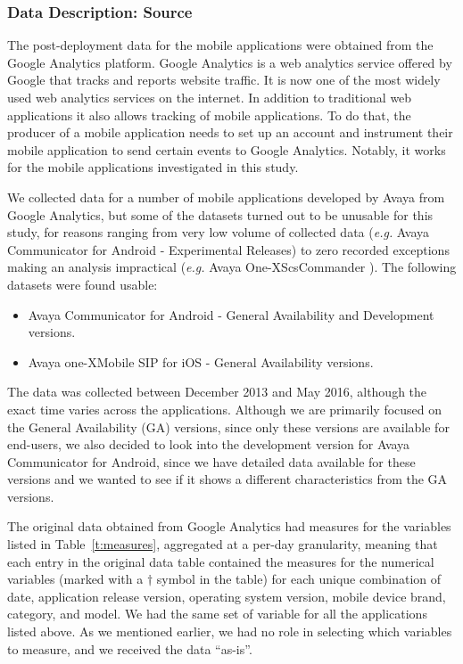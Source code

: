 \documentclass[smallcondensed]{svjour3}     %
\begin{document}
\subsubsection{Data Description: Source}
The post-deployment data for the mobile applications were obtained from the 
Google Analytics platform.
Google Analytics is a web analytics service offered by
Google that tracks and reports website traffic. It is now one of the most
widely used web analytics services on the internet. In addition to
traditional web applications it also allows tracking of mobile
applications. To do that, the producer of a mobile application needs
to set up an account and instrument their mobile application to send certain
events to Google Analytics. Notably, it works for the mobile
applications investigated in this study. 

We collected data for a number of mobile applications developed by Avaya from Google Analytics, but some of the datasets turned out to be unusable for this study, for reasons ranging from very low volume of collected data (\textit{e.g.} Avaya Communicator for Android - Experimental Releases) to zero recorded exceptions making an analysis impractical (\textit{e.g.} Avaya One-X\textregistered   ScsCommander ). The following datasets were found usable:
\begin{itemize}
    \item Avaya Communicator for Android - General Availability and Development versions.
    \item Avaya one-X\textregistered Mobile  SIP for  iOS - General Availability versions.
\end{itemize}

The data was collected between December 2013 and May 2016, although the exact time varies across the applications. Although we are primarily focused on the General Availability (GA) versions, since only these versions are available for end-users, we also decided to look into the development version for Avaya Communicator for Android, since we have detailed data available for these versions and we wanted to see if it shows a different characteristics from the GA versions.  

The original data obtained from Google Analytics had measures for the variables 
listed in Table~\ref{t:measures}, aggregated at a per-day granularity, meaning 
that each entry in the original data table contained the measures for the numerical 
variables (marked with a $\dagger$ symbol in the table) for each unique combination
of date, application release version, operating system version, mobile device brand, 
category, and model. We had the same set of variable for all the applications listed above.
As we mentioned earlier, we had no role in selecting which variables to measure, and we received the data ``as-is''.
\end{document}
